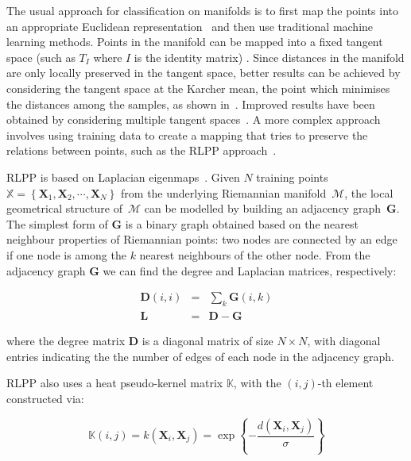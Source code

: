 \documentclass[10pt,twocolumn,letterpaper]{article}
\newcommand{\eqsize}{\footnotesize}
\newcommand{\mat}[1]{{\boldsymbol{#1}}}
\begin{document}
The usual approach for classification on manifolds
is to first map the points into an appropriate Euclidean representation~\cite{TuzelEtAl2008}
and then use traditional machine learning methods.
Points in the manifold can be mapped into a fixed tangent space (such as $T_I$ where $I$ is the identity matrix) \cite{GuoEtAl2010}.
Since distances in the manifold are only locally preserved in the tangent space,
better results can be achieved by considering the tangent space at the Karcher mean,
the point which minimises the distances among the samples, as shown in~\cite{TuzelEtAl2008}.
Improved results have been obtained by considering multiple tangent spaces~\cite{Lui2010,SaninEtAl2012}.
A more complex approach involves using training data to create a mapping that tries to preserve
the relations between points, such as the RLPP approach~\cite{HarandiEtAl2012}.



RLPP is based on Laplacian eigenmaps~\cite{BelkinAndNiyogi2003}.
Given {\eqsize $N$} training points
\mbox{\eqsize $\mathbb{X}= \left\{\mat{X}_1,\mat{X}_2, \cdots, \mat{X}_N\right\}$}
from the underlying Riemannian manifold~{\eqsize $\mathcal{M}$},
the local geometrical structure of~{\eqsize $\mathcal{M}$} can be modelled by building an adjacency graph~{\eqsize $\mat{G}$}.
The simplest form of {\eqsize $\mat{G}$} is a binary graph obtained based on the nearest neighbour properties of Riemannian points:
two nodes are connected by an edge if one node is among the $k$ nearest neighbours of the other node.
From the adjacency graph {\eqsize $\mat{G}$} we can find the degree and Laplacian matrices, respectively:

\vspace{-1ex}
\noindent
\eqsize
\begin{eqnarray}
  \mat{D}(i,i) &=& \sum\nolimits_k \mat{G}(i,k)\\
  \mat{L}      &=& \mat{D} - \mat{G}
\end{eqnarray}
\normalsize

\noindent
where the degree
matrix {\eqsize $\mat{D}$} is a diagonal matrix of size \mbox{\eqsize $N \times N$},
with diagonal entries indicating the the number of edges of each node in the adjacency graph.

RLPP also uses a heat pseudo-kernel matrix {\eqsize $\mathbb{K}$},
with the {\eqsize $(i,j)$}-th element constructed via:

\noindent
\eqsize
\begin{equation}
  \mathbb{K}(i,j) = k(\mat{X}_i,\mat{X}_j) = \exp \left\{-\frac{d(\mat{X}_i,\mat{X}_j)}{\sigma} \right\}
  \label{eq:kernel_matrix}
\end{equation}
\normalsize
\end{document}
